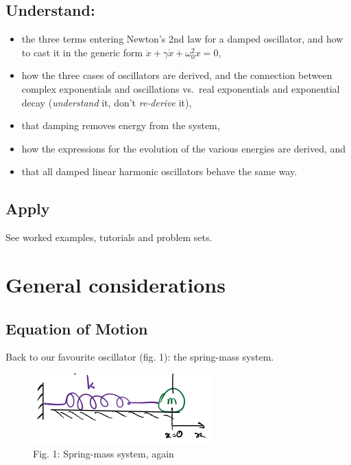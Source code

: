 \documentclass[11pt]{article}
\makeatletter
\def\maxwidth{\ifdim\Gin@nat@width>\linewidth\linewidth
    \else\Gin@nat@width\fi}
\let\Oldincludegraphics\includegraphics
\renewcommand{\includegraphics}[1]{\Oldincludegraphics[width=.8\maxwidth]{#1}}
\providecommand{\tightlist}{%
      \setlength{\itemsep}{0pt}\setlength{\parskip}{0pt}}
\makeatother
\begin{document}
    \hypertarget{understand}{%
\subsection{Understand:}\label{understand}}

\begin{itemize}
\tightlist
\item
  the three terms entering Newton's 2nd law for a damped oscillator, and
  how to cast it in the generic form
  \(\ddot x + \gamma \dot x + \omega_0^2x = 0\),
\item
  how the three cases of oscillators are derived, and the connection
  between complex exponentials and oscillations vs.~real exponentials
  and exponential decay (\emph{understand} it, don't \emph{re-derive}
  it),
\item
  that damping removes energy from the system,
\item
  how the expressions for the evolution of the various energies are
  derived, and
\item
  that all damped linear harmonic oscillators behave the same way.
\end{itemize}

    \hypertarget{apply}{%
\subsection{Apply}\label{apply}}

See worked examples, tutorials and problem sets.

    \hypertarget{general-considerations}{%
\section{General considerations}\label{general-considerations}}

\hypertarget{equation-of-motion}{%
\subsection{Equation of Motion}\label{equation-of-motion}}

    Back to our favourite oscillator (fig. 1): the spring-mass system.

\begin{figure}
\centering
\includegraphics{SpringMass.png}
\caption{Fig. 1: Spring-mass system, again}
\end{figure}
\end{document}
